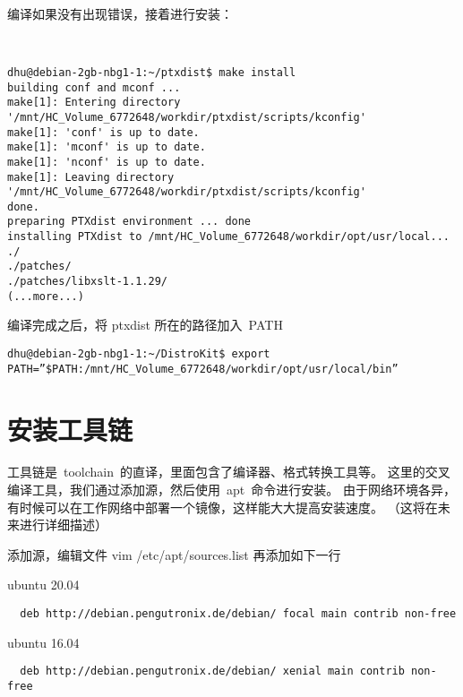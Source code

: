编译如果没有出现错误，接着进行安装：

\begin{lstlisting}
  

dhu@debian-2gb-nbg1-1:~/ptxdist$ make install
building conf and mconf ...
make[1]: Entering directory '/mnt/HC_Volume_6772648/workdir/ptxdist/scripts/kconfig'
make[1]: 'conf' is up to date.
make[1]: 'mconf' is up to date.
make[1]: 'nconf' is up to date.
make[1]: Leaving directory '/mnt/HC_Volume_6772648/workdir/ptxdist/scripts/kconfig'
done.
preparing PTXdist environment ... done
installing PTXdist to /mnt/HC_Volume_6772648/workdir/opt/usr/local...
./
./patches/
./patches/libxslt-1.1.29/
(...more...)

\end{lstlisting}


编译完成之后，将 ptxdist 所在的路径加入~PATH
\begin{lstlisting}
dhu@debian-2gb-nbg1-1:~/DistroKit$ export PATH=”$PATH:/mnt/HC_Volume_6772648/workdir/opt/usr/local/bin”
\end{lstlisting}

\section{安装工具链}
工具链是~toolchain~的直译，里面包含了编译器、格式转换工具等。
这里的交叉编译工具，我们通过添加源，然后使用~apt~命令进行安装。
由于网络环境各异，有时候可以在工作网络中部署一个镜像，这样能大大提高安装速度。
（这将在未来进行详细描述）

添加源，编辑文件 vim /etc/apt/sources.list 再添加如下一行

ubuntu 20.04
\begin{lstlisting} 
  deb http://debian.pengutronix.de/debian/ focal main contrib non-free
\end{lstlisting}

ubuntu 16.04
\begin{lstlisting} 
  deb http://debian.pengutronix.de/debian/ xenial main contrib non-free
\end{lstlisting}

